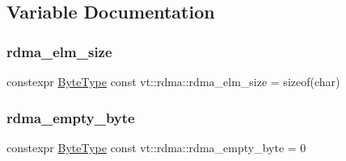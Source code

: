 \subsection{Variable Documentation}
\mbox{\label{namespacevt_1_1rdma_ad167cbb60749088647bbeee80ded6100}} 
\subsubsection{\texorpdfstring{rdma\+\_\+elm\+\_\+size}{rdma\_elm\_size}}
{\footnotesize\ttfamily constexpr \hyperlink{namespacevt_aab8d55968084610ce3b17057981e9300}{Byte\+Type} const vt\+::rdma\+::rdma\+\_\+elm\+\_\+size = sizeof(char)}

\mbox{\label{namespacevt_1_1rdma_aa4cbaba7c412337495b61a42d3eb134c}} 
\subsubsection{\texorpdfstring{rdma\+\_\+empty\+\_\+byte}{rdma\_empty\_byte}}
{\footnotesize\ttfamily constexpr \hyperlink{namespacevt_aab8d55968084610ce3b17057981e9300}{Byte\+Type} const vt\+::rdma\+::rdma\+\_\+empty\+\_\+byte = 0}


